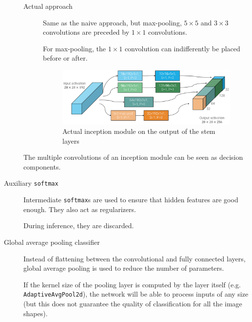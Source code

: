 \begin{description}
\begin{description}
                
            \item[Actual approach] 
                Same as the naive approach, but max-pooling, $5 \times 5$ and $3 \times 3$ convolutions
                are preceded by $1 \times 1$ convolutions.
                
                \begin{remark}
                    For max-pooling, the $1 \times 1$ convolution can indifferently be placed before or after.    
                \end{remark}

                \begin{figure}[H]
                    \centering
                    \includegraphics[width=0.65\linewidth]{./img/_actual_inception.pdf}
                    \caption{Actual inception module on the output of the stem layers}
                \end{figure}
            \end{description}
        \begin{remark}
            The multiple convolutions of an inception module can be seen as decision components.
        \end{remark}

    \item[Auxiliary \texttt{softmax}]
        Intermediate \texttt{softmax}s are used to ensure that hidden features are good enough.
        They also act as regularizers.

        During inference, they are discarded.

    \item[Global average pooling classifier] 
        Instead of flattening between the convolutional and fully connected layers, 
        global average pooling is used to reduce the number of parameters.

        \begin{remark}
            If the kernel size of the pooling layer is computed by the layer itself (e.g. \texttt{AdaptiveAvgPool2d}), 
            the network will be able to process inputs of any size (but this does not guarantee the quality of classification for all the image shapes).
        \end{remark}
    
\end{description}

